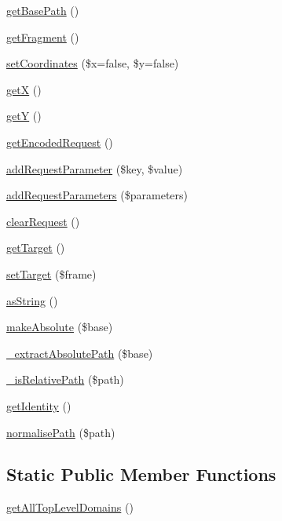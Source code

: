 \begin{DoxyCompactItemize}
\item 
\hyperlink{class_simple_url_a365bd0b1cd84de5ed75b1b561b3f32cc}{getBasePath} ()
\item 
\hyperlink{class_simple_url_ad0c87b70e537cc749dc4f7663efc88a7}{getFragment} ()
\item 
\hyperlink{class_simple_url_a69470a9a8b5b189e01e690b13b4aef77}{setCoordinates} (\$x=false, \$y=false)
\item 
\hyperlink{class_simple_url_a3833f1dbcb91195f215a77b3e58fc95e}{getX} ()
\item 
\hyperlink{class_simple_url_aab225e4a1778f8b8211835c83761b331}{getY} ()
\item 
\hyperlink{class_simple_url_a902d795b570581c345a9cb1018db2f82}{getEncodedRequest} ()
\item 
\hyperlink{class_simple_url_a340f16158f6b4e31b41759faab48c0b5}{addRequestParameter} (\$key, \$value)
\item 
\hyperlink{class_simple_url_a1aa2b909d32c56aac770263592d2844e}{addRequestParameters} (\$parameters)
\item 
\hyperlink{class_simple_url_ad8b21a3ad600952a57aada6e157a1d7b}{clearRequest} ()
\item 
\hyperlink{class_simple_url_a2d27d22fc50bcdb12adcbaaa87a988a4}{getTarget} ()
\item 
\hyperlink{class_simple_url_a73145ca562cfc288ad71792ae0027448}{setTarget} (\$frame)
\item 
\hyperlink{class_simple_url_aacb36466e60fa5c022e9c30fb82caf67}{asString} ()
\item 
\hyperlink{class_simple_url_a06bbcf19f78e78bc6f1ea8604a9541ce}{makeAbsolute} (\$base)
\item 
\hyperlink{class_simple_url_a56da2f1399b0231dec5224f8c431b1f6}{\_\-extractAbsolutePath} (\$base)
\item 
\hyperlink{class_simple_url_a950016c5387e828c0f11e1cfe38467b5}{\_\-isRelativePath} (\$path)
\item 
\hyperlink{class_simple_url_acde95c2b6cce0583b06854947603c048}{getIdentity} ()
\item 
\hyperlink{class_simple_url_a50e343f5c31919b3d1051760f32ec3ae}{normalisePath} (\$path)
\end{DoxyCompactItemize}
\subsection*{Static Public Member Functions}
\begin{DoxyCompactItemize}
\item 
\hyperlink{class_simple_url_a6b3d4e1240aedd44290fe7b21b36a4e9}{getAllTopLevelDomains} ()
\end{DoxyCompactItemize}
